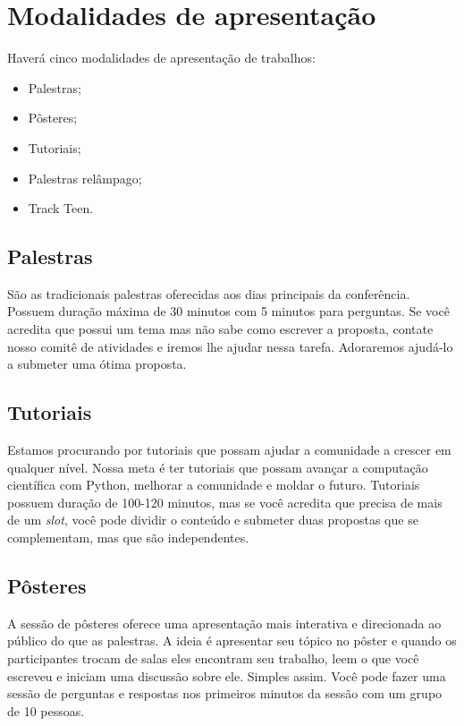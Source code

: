 \documentclass[a4paper,twocolumn,openright,article]{memoir}
\begin{document}
\chapter*{Modalidades de apresentação}

Haverá 
cinco
%
modalidades de apresentação de trabalhos:
\begin{itemize}
\item Palestras;
\item Pôsteres;
\item Tutoriais;
\item Palestras relâmpago;
\item Track Teen.
\end{itemize}

\section*{Palestras}

São as tradicionais palestras oferecidas aos dias principais da conferência. Possuem duração máxima de 30 minutos com 5 minutos para perguntas. Se você acredita
que possui um tema mas não sabe como escrever a proposta, contate nosso comitê
de atividades e iremos lhe ajudar nessa tarefa. Adoraremos ajudá-lo a submeter
uma ótima proposta.

\section*{Tutoriais}

Estamos procurando por tutoriais que possam ajudar a comunidade a crescer em qualquer nível. Nossa meta é ter tutoriais que possam avançar a computação científica com Python, melhorar a comunidade e moldar o futuro. Tutoriais possuem duração de 100-120 minutos, mas se você acredita que precisa de mais de um \emph{slot}, você pode dividir o conteúdo e submeter duas propostas que se complementam, mas que são independentes.

\section*{Pôsteres}

A sessão de pôsteres oferece uma apresentação mais interativa e direcionada ao público do que as palestras. A ideia é apresentar seu tópico no pôster e quando os participantes trocam de salas eles encontram seu trabalho, leem o que você escreveu e iniciam uma discussão sobre ele. Simples assim. Você pode fazer uma sessão de perguntas e respostas nos primeiros minutos da sessão com um grupo de 10 pessoas.
\end{document}
